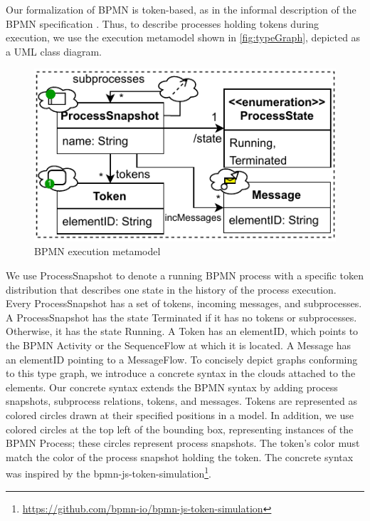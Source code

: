 \documentclass[runningheads]{llncs}
\begin{document}
Our formalization of BPMN is token-based, as in the informal description of the BPMN specification \cite{objectmanagementgroupBusinessProcessModel2013}.
Thus, to describe processes holding tokens during execution, we use the execution metamodel shown in \autoref{fig:typeGraph}, depicted as a UML class diagram.

\begin{figure}[ht]
  \centering
  \includegraphics[width=0.6\linewidth]{images/bpmn_semantics-typegraph.pdf}
  \caption{BPMN execution metamodel}
  \label{fig:typeGraph}
\end{figure}

We use \textsf{ProcessSnapshot} to denote a running BPMN process with a specific token distribution that describes one state in the history of the process execution.
Every \textsf{ProcessSnapshot} has a set of \textsf{tokens}, incoming \textsf{messages}, and \textsf{subprocesses}.
A \textsf{ProcessSnapshot} has the state \textsf{Terminated} if it has no \textsf{tokens} or \textsf{subprocesses}.
Otherwise, it has the state \textsf{Running}.
A \textsf{Token} has an \textsf{elementID}, which points to the BPMN \textsf{Activity} or the \textsf{SequenceFlow} at which it is located.
A \textsf{Message} has an \textsf{elementID} pointing to a \textsf{MessageFlow}.
To concisely depict graphs conforming to this type graph, we introduce a concrete syntax in the clouds attached to the elements.
Our concrete syntax extends the BPMN syntax by adding process snapshots, subprocess relations, tokens, and messages.
Tokens are represented as colored circles drawn at their specified positions in a model.
In addition, we use colored circles at the top left of the bounding box, representing instances of the BPMN \textsf{Process}; these circles represent process snapshots.
The token's color must match the color of the process snapshot holding the token.
The concrete syntax was inspired by the bpmn-js-token-simulation\footnote{\url{https://github.com/bpmn-io/bpmn-js-token-simulation}}.
\end{document}
